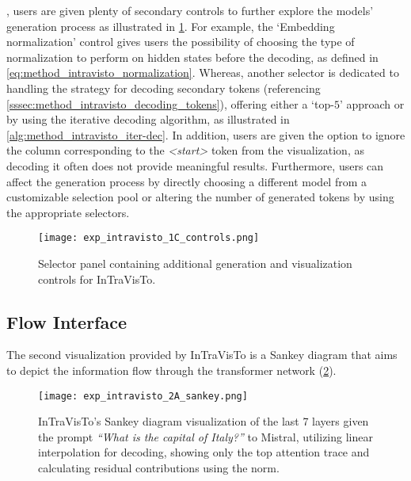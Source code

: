 , users are given plenty of secondary controls to further explore the models' generation process as illustrated in \cref{fig:exp_intravisto_1_C}.
For example, the `Embedding normalization' control gives users the possibility of choosing the type of normalization to perform on hidden states before the decoding, as defined in \cref{eq:method_intravisto_normalization}.
Whereas, another selector is dedicated to handling the strategy for decoding secondary tokens (referencing \cref{sssec:method_intravisto_decoding_tokens}), offering either a `top-$5$' approach or by using the iterative decoding algorithm, as illustrated in \cref{alg:method_intravisto_iter-dec}.
In addition, users are given the option to ignore the column corresponding to the \emph{<start>} token from the visualization, as decoding it often does not provide meaningful results.
Furthermore, users can affect the generation process by directly choosing a different model from a customizable selection pool or altering the number of generated tokens by using the appropriate selectors.

\begin{figure}[t!]
    \centering
    \texttt{[image: exp\_intravisto\_1C\_controls.png]}
    \caption{Selector panel containing additional generation and visualization controls for InTraVisTo.}
    \label{fig:exp_intravisto_1_C}
\end{figure}

\subsection{Flow Interface}\label{sec:exp_intravisto_exp2}

The second visualization provided by InTraVisTo is a Sankey diagram that aims to depict the information flow through the transformer network (\cref{fig:exp_intravisto_2_A}).

\begin{figure}[t!]
    \centering
    \texttt{[image: exp\_intravisto\_2A\_sankey.png]}
    \caption[InTraVisTo's Sankey diagram visualization given the prompt \emph{``What is the capital of Italy?''} to Mistral.]{InTraVisTo's Sankey diagram visualization of the last 7 layers given the prompt \emph{``What is the capital of Italy?''} to Mistral, utilizing linear interpolation for decoding, showing only the top attention trace and calculating residual contributions using the norm.}
    \label{fig:exp_intravisto_2_A}
\end{figure}

